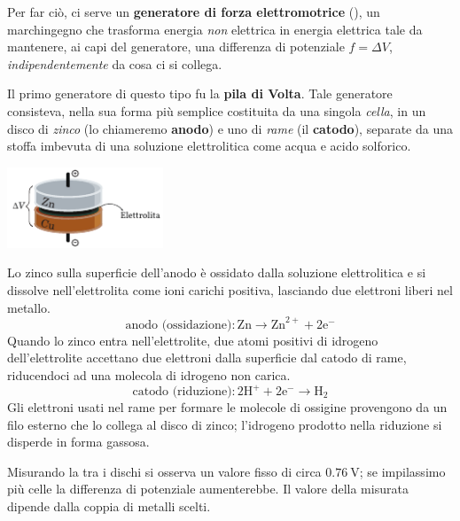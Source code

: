 Per far ciò, ci serve un \textbf{generatore di forza elettromotrice} (\fem), un marchingegno che trasforma energia \textit{non} elettrica in energia elettrica tale da mantenere, ai capi del generatore, una differenza di potenziale $f=\Delta V$, \textit{indipendentemente} da cosa ci si collega.\label{fem}
\begin{digressionwt}
	Il primo generatore di questo tipo fu la \textbf{pila di Volta}. Tale generatore consisteva, nella sua forma più semplice costituita da una singola \textit{cella}, in un disco di \textit{zinco} (lo chiameremo \textbf{anodo}) e uno di \textit{rame} (il \textbf{catodo}), separate da una stoffa imbevuta di una soluzione elettrolitica come acqua e acido solforico.
	\begin{center}
		\includegraphics[width=0.35\textwidth]{images/chp5/chp5piladivolta.pdf}
	\end{center}
	Lo zinco sulla superficie dell'anodo è ossidato dalla soluzione elettrolitica e si dissolve nell'elettrolita come ioni carichi positiva, lasciando due elettroni liberi nel metallo.
	\begin{equation*}
		\text{anodo (ossidazione)}\colon \mathrm{Zn}\to\mathrm{Zn}^{2+}+2\mathrm{e}^{-}
	\end{equation*}
	Quando lo zinco entra nell'elettrolite, due atomi positivi di idrogeno dell'elettrolite accettano due elettroni dalla superficie dal catodo di rame, riducendoci ad una molecola di idrogeno non carica.
	\begin{equation*}
		\text{catodo (riduzione)}\colon2\mathrm{H}^{+}+2\mathrm{e}^{-}\to\mathrm{H}_2
	\end{equation*}
	Gli elettroni usati nel rame per formare le molecole di ossigine provengono da un filo esterno che lo collega al disco di zinco; l'idrogeno prodotto nella riduzione si disperde in forma gassosa.

	Misurando la \ddp tra i dischi si osserva un valore fisso di circa $\SI{0,76}{\volt}$; se impilassimo più celle la differenza di potenziale aumenterebbe. Il valore della \ddp misurata dipende dalla coppia di metalli scelti.
\end{digressionwt}
